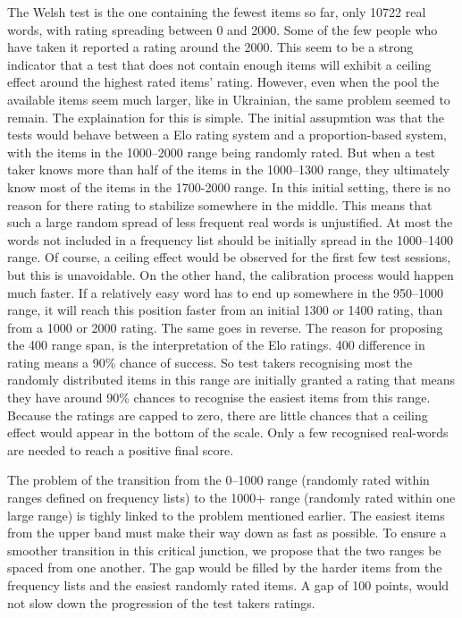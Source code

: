 The Welsh test is the one containing the fewest items so far, only 10722 real words, with rating spreading between 0 and 2000. Some of the few people who have taken it reported a rating around the 2000. This seem to be a strong indicator that a test that does not contain enough items will exhibit a ceiling effect around the highest rated items' rating. However, even when the pool the available items seem much larger, like in Ukrainian, the same problem seemed to remain. The explaination for this is simple. The initial assupmtion was that the tests would behave between a Elo rating system and a proportion-based system, with the items in the 1000–2000 range being randomly rated. But when a test taker knows more than half of the items in the 1000–1300 range, they ultimately know most of the items in the 1700-2000 range. In this initial setting, there is no reason for there rating to stabilize somewhere in the middle. This means that such a large random spread of less frequent real words is unjustified. At most the words not included in a frequency list should be initially spread in the 1000–1400 range. Of course, a ceiling effect would be observed for the first few test sessions, but this is unavoidable. On the other hand, the calibration process would happen much faster. If a relatively easy word has to end up somewhere in the 950–1000 range, it will reach this position faster from an initial 1300 or 1400 rating, than from a 1000 or 2000 rating. The same goes in reverse. The reason for proposing the 400 range span, is the interpretation of the Elo ratings. 400 difference in rating means a 90\% chance of success. So test takers recognising most the randomly distributed items in this range are initially granted a rating that means they have around 90\% chances to recognise the easiest items from this range.
Because the ratings are capped to zero, there are little chances that a ceiling effect would appear in the bottom of the scale. Only a few recognised real-words are needed to reach a positive final score.

The problem of the transition from the 0–1000 range (randomly rated within ranges defined on frequency lists) to the 1000+ range (randomly rated within one large range) is tighly linked to the problem mentioned earlier. The easiest items from the upper band must make their way down as fast as possible. To ensure a smoother transition in this critical junction, we propose that the two ranges be spaced from one another. The gap would be filled by the harder items from the frequency lists and the easiest randomly rated items. A gap of 100 points, would not slow down the progression of the test takers ratings.

